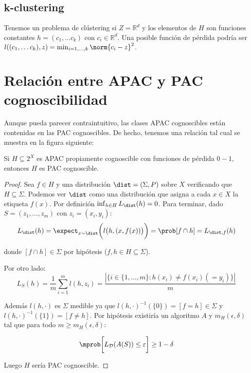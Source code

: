 \subsection{k-clustering}
Tenemos un problema de clústering si $Z=\mathbb{R}^d$ y los elementos de $H$ son funciones constantes 
$h = (c_1, \ldots c_k)$ con $c_i \in \mathbb{R}^d$. Una posible función de pérdida podría ser 
$l((c_1, \ldots c_k), z) = \min_{i=1,\ldots, k} \norm{c_i - z}^2$.


\section{Relación entre APAC y PAC cognoscibilidad}
Aunque pueda parecer contraintuitivo, las clases APAC cognoscibles están contenidas en las PAC cognoscibles. De hecho, 
tenemos una relación tal cual se muestra en la figura siguiente:


\begin{fact}
 Si $H\subseteq 2^X$ es APAC propiamente cognoscible con funciones de pérdida $0-1$, entonces $H$ es PAC cognoscible.
\end{fact}

\begin{proof}
 Sea $f\in H$ y una distribución $\dist=(\Sigma,P)$ sobre $X$ verificando que $H\subseteq \Sigma$. Podemos ver 
 $\dist$ como una distribución que asigna a cada $x\in X$ la etiqueta $f(x)$. Por definición $\inf_{h\in H} L_{\dist}(h) = 0$. 
 Para terminar, dado $S=(z_1, \ldots, z_m)$ con $z_i = (x_i,y_i)$:
 \[L_{\dist}(h) = \expect_{x\sim \dist}\bigg(l \big(h,(x,f(x)) \big)\bigg) = \prob[f \cap h] = L_{\dist,f}(h)\]
 
 donde $[f\cap h] \in \Sigma$ por hipótesis ($f,h\in H \subseteq \Sigma$).
 
 Por otro lado:
 \[L_{S}(h) = \frac{1}{m} \sum_{i=1}^m l(h,z_i) = \frac{|\{i\in\{1,\ldots, m\}: h(x_i) \neq f(x_i)(= y_i)\}|}{m}\]
 
 Además $l(h,\cdot)$ es $\Sigma$ medible ya que $l(h, \cdot)^{-1}(\{0\}) = [f = h] \in \Sigma$ y 
 $l(h, \cdot)^{-1}(\{1\}) = [f\neq h]$. Por hipótesis existiría un algoritmo $A$ y $m_H(\epsilon, \delta)$
 tal que para todo $m\ge m_H(\epsilon, \delta)$:
 
 \[\mprob \bigg[L_{\mathcal{D}}(A(S)) \le \varepsilon \bigg] \ge 1-\delta\]
 
 Luego $H$ sería PAC cognoscible.
\end{proof}